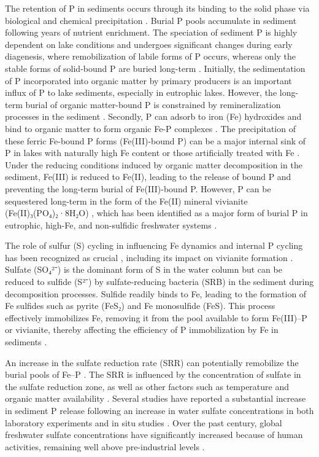 \documentclass[12pt,twoside]{book}
\begin{document}
The retention of P in sediments occurs through its binding to the solid phase via biological and chemical precipitation \citep{Boers1998, Parsons2017, OConnell2020}. Burial P pools accumulate in sediment following years of nutrient enrichment. The speciation of sediment P is highly dependent on lake conditions and undergoes significant changes during early diagenesis, where remobilization of labile forms of P occurs, whereas only the stable forms of solid-bound P are buried long-term \citep{Emerson1976, Boers1998}. Initially, the sedimentation of P incorporated into organic matter by primary producers is an important influx of P to lake sediments, especially in eutrophic lakes. However, the long-term burial of organic matter-bound P is constrained by remineralization processes in the sediment \citep{Boers1998}. Secondly, P can adsorb to iron (Fe) hydroxides \citep{Gunnars2002} and bind to organic matter to form organic Fe-P complexes \citep{Schwertmann1988}. The precipitation of these ferric Fe-bound P forms (Fe(III)-bound P) can be a major internal sink of P in lakes with naturally high Fe content \citep{Reitzel2005, Hupfer2008} or those artificially treated with Fe \citep{Kleeberg2012, Munch2024}. Under the reducing conditions induced by organic matter decomposition in the sediment, Fe(III) is reduced to Fe(II), leading to the release of bound P and preventing the long-term burial of Fe(III)-bound P. However, P can be sequestered long-term in the form of the Fe(II) mineral vivianite (Fe(II)₃(PO₄)₂·8H₂O) \citep{Rothe2016}, which has been identified as a major form of burial P in eutrophic, high-Fe, and non-sulfidic freshwater systems \citep{OConnell2015, Rothe2016, Dijkstra2018, Kubeneck2021}.

The role of sulfur (S) cycling in influencing Fe dynamics and internal P cycling has been recognized as crucial \citep{Kleeberg1997, Rozan2002, Wang2018, Heinrich2021}, including its impact on vivianite formation \citep{Rothe2015}. Sulfate (SO₄²⁻) is the dominant form of S in the water column but can be reduced to sulfide (S²⁻) by sulfate-reducing bacteria (SRB) in the sediment during decomposition processes. Sulfide readily binds to Fe, leading to the formation of Fe sulfides such as pyrite (FeS₂) and Fe monosulfide (FeS). This process effectively immobilizes Fe, removing it from the pool available to form Fe(III)--P or vivianite, thereby affecting the efficiency of P immobilization by Fe in sediments \citep{Heinrich2020}.

An increase in the sulfate reduction rate (SRR) can potentially remobilize the burial pools of Fe--P \citep{Roden1997, Katsev2006}. The SRR is influenced by the concentration of sulfate in the sulfate reduction zone, as well as other factors such as temperature \citep{Zhao2021, Han2023} and organic matter availability \citep{Chen2014, Zhao2019}. Several studies have reported a substantial increase in sediment P release following an increase in water sulfate concentrations in both laboratory experiments \citep{Zak2006, Baldwin2012, Chen2016, Zhou2022} and in situ studies \citep{Smolders1993, Lamers2002}. Over the past century, global freshwater sulfate concentrations have significantly increased because of human activities, remaining well above pre-industrial levels \citep{Kleeberg2014, Zak2021}.
\end{document}
